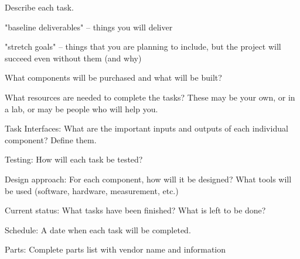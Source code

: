 



Describe each task.
\itemize
\item "baseline deliverables" -- things you will deliver
\item "stretch goals" -- things that you are planning to include, but the project will succeed even without them (and why)
\item What components will be purchased and what will be built?
\item What resources are needed to complete the tasks? These may be your own, or in a lab, or may be people who will help you.
\item Task Interfaces: What are the important inputs and outputs of each individual component? Define them.
\item Testing: How will each task be tested?
\item Design approach: For each component, how will it be designed? What tools will be used (software, hardware, measurement, etc.)
\item Current status: What tasks have been finished? What is left to be done?
\item Schedule: A date when each task will be completed.
\item Parts: Complete parts list with vendor name and information